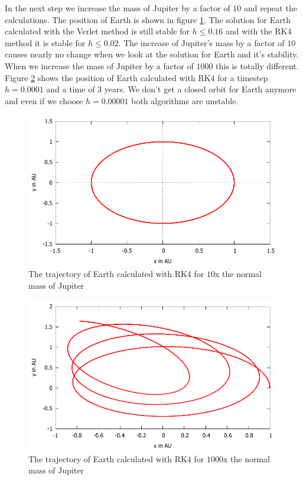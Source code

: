 \documentclass[11pt,a4wide]{article}
\begin{document}
In the next step we increase the mass of Jupiter by a factor of $10$ and repeat the calculations. The position of Earth is shown in figure \ref{fig:EarthXY 10x}. The solution for Earth calculated with the Verlet method is still stable for $h\le0.16$ and with the RK$4$ method it is stable for $h\le 0.02$. The increase of Jupiter's mass by a factor of $10$ causes nearly no change when we look at the solution for Earth and it's stability. When we increase the mass of Jupiter by a factor of $1000$ this is totally different. Figure \ref{fig:EarthXY 1000x} shows the position of Earth calculated with RK$4$ for a timestep $h=0.0001$ and a time of $3$ years. We don't get a closed orbit for Earth anymore and even if we choose $h=0.00001$ both algorithms are unstable.

\begin{figure}
\centering
\includegraphics[scale=0.45]{positionEarth10x3a.pdf}
\caption{The trajectory of Earth calculated with RK$4$ for $10$x the normal mass of Jupiter}
\label{fig:EarthXY 10x}
\end{figure}  

\begin{figure}
\centering
\includegraphics[scale=0.45]{positionEarth1000x3a.pdf}
\caption{The trajectory of Earth calculated with RK$4$ for $1000$x the normal mass of Jupiter}
\label{fig:EarthXY 1000x}
\end{figure} 
\end{document}
